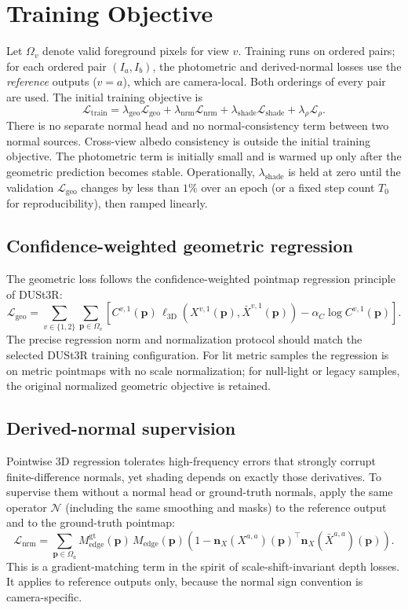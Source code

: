 \documentclass[11pt,a4paper]{article}
\newcommand{\Loss}{\mathcal{L}}
\begin{document}
\section{Training Objective}

Let $\Omega_v$ denote valid foreground pixels for view $v$. Training runs on
ordered pairs; for each ordered pair $(I_a,I_b)$, the photometric and
derived-normal losses use the \emph{reference} outputs ($v=a$), which are
camera-local. Both orderings of every pair are used. The initial training objective is
\[
  \boxed{
  \Loss_{\mathrm{train}}
  =
  \lambda_{\mathrm{geo}}\Loss_{\mathrm{geo}}
  +\lambda_{\mathrm{nrm}}\Loss_{\mathrm{nrm}}
  +\lambda_{\mathrm{shade}}\Loss_{\mathrm{shade}}
  +\lambda_{\rho}\Loss_{\rho}.
  }
\]
There is no separate normal head and no normal-consistency term between two
normal sources. Cross-view albedo consistency is outside the initial
training objective. The photometric term is initially small and is warmed up only after the
geometric prediction becomes stable.
Operationally, $\lambda_{\mathrm{shade}}$ is held at zero until the
validation $\Loss_{\mathrm{geo}}$ changes by less than $1\%$ over an
epoch (or a fixed step count $T_0$ for reproducibility), then ramped
linearly.

\subsection{Confidence-weighted geometric regression}

The geometric loss follows the confidence-weighted pointmap regression
principle of DUSt3R:
\[
  \Loss_{\mathrm{geo}}
  =
  \sum_{v\in\{1,2\}}\sum_{\bm p\in\Omega_v}
  \left[
    C^{v,1}(\bm p)\,
    \ell_{\mathrm{3D}}
    \left(
      X^{v,1}(\bm p),
      \bar X^{v,1}(\bm p)
    \right)
    -\alpha_C\log C^{v,1}(\bm p)
  \right].
\]
The precise regression norm and normalization protocol should match the
selected DUSt3R training configuration. For lit metric samples the regression is on metric pointmaps with no scale
normalization; for null-light or legacy samples, the
original normalized geometric objective is retained.

\subsection{Derived-normal supervision}

Pointwise 3D regression tolerates high-frequency errors that strongly
corrupt finite-difference normals, yet shading depends on exactly those
derivatives. To supervise them without a normal head or ground-truth normals,
apply the same operator $\mathcal N$ (including the same smoothing and masks)
to the reference output and to the ground-truth pointmap:
\[
  \Loss_{\mathrm{nrm}}
  =
  \sum_{\bm p\in\Omega_a}
  M_{\mathrm{edge}}^{\mathrm{gt}}(\bm p)\,M_{\mathrm{edge}}(\bm p)
  \left(
    1-\bm n_X\!\left(X^{a,a}\right)(\bm p)^{\!\top}
    \bm n_X\!\left(\bar X^{a,a}\right)(\bm p)
  \right).
\]
This is a gradient-matching term in the spirit of scale-shift-invariant
depth losses. It applies to reference outputs only, because the normal
sign convention is camera-specific.
\end{document}
